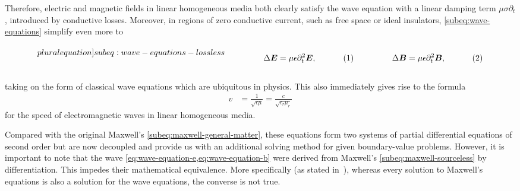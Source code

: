 \documentclass[11pt,a4paper,twoside,openany]{report}
\begin{document}
Therefore, electric and magnetic fields in linear homogeneous media both clearly satisfy the wave equation with a linear damping term $\mu\sigma\partial_t$, introduced by conductive losses. Moreover, in regions of zero conductive current, such as free space or ideal insulators, \cref{subeq:wave-equations} simplify even more to\\
\begin{subequations}
    \label[pluralequation]{subeq:wave-equations-lossless}
    \noindent\centering
    \begin{minipage}{0.45\textwidth}
        \begin{align}
            \label{eq:wave-equation-e-lossless}
            \Delta\vec E &= \mu\epsilon\partial^2_t\vec E,
        \end{align}
    \end{minipage}
    \hfill
    \begin{minipage}{0.45\textwidth}
        \begin{align}
            \label{eq:wave-equations-b-lossless}
            \Delta\vec B &= \mu\epsilon\partial^2_t\vec B,
        \end{align}
    \end{minipage}\bigskip
\end{subequations}\\
taking on the form of classical wave equations which are ubiquitous in physics. This also immediately gives rise to the formula
\begin{align}
    v &= \frac{1}{\sqrt{\epsilon\mu}} = \frac{c}{\sqrt{\epsilon_r\mu_r}}
\end{align}
for the speed of electromagnetic waves in linear homogeneous media.

\begin{remark}
    \label{remark:nonequivalence-of-wave-equations-with-maxwells-equations}
    Compared with the original Maxwell's \cref{subeq:maxwell-general-matter}, these equations form two systems of partial differential equations of second order but are now decoupled and provide us with an additional solving method for given boundary-value problems. However, it is important to note that the wave \cref{eq:wave-equation-e,eq:wave-equation-b} were derived from Maxwell's \cref{subeq:maxwell-sourceless} by differentiation. This impedes their mathematical equivalence. More specifically (as stated in~\parencite{griffiths:introduction-to-electrodynamics}), whereas every solution to Maxwell's equations is also a solution for the wave equations, the converse is not true.
\end{remark}
\end{document}
